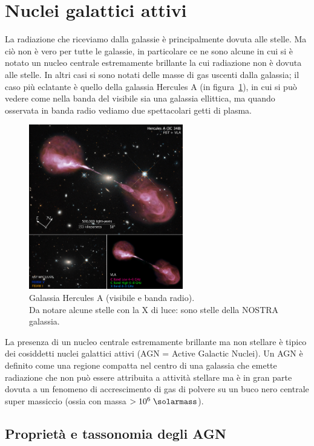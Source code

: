 \section{Nuclei galattici attivi} \label{sec:nuclei-galattici-attivi}
La radiazione che riceviamo dalla galassie è principalmente dovuta alle stelle. Ma ciò non è vero per tutte le galassie, in particolare ce ne sono alcune in cui si è notato un nucleo centrale estremamente brillante la cui radiazione non è dovuta alle stelle. In altri casi si sono notati delle masse di gas uscenti dalla galassia; il caso più eclatante è quello della galassia Hercules A (in figura~\ref{fig:hercules-a}), in cui si può vedere come nella banda del visibile sia una galassia ellittica, ma quando osservata in banda radio vediamo due spettacolari getti di plasma.

\begin{figure}
    \centering
    \includegraphics[width = 0.6\textwidth]{immagini/hercules-a.png}
    \caption{Galassia Hercules A (visibile e banda radio). \\ Da notare alcune stelle con la X di luce: sono stelle della NOSTRA galassia.}
    \label{fig:hercules-a}
\end{figure}

La presenza di un nucleo centrale estremamente brillante ma non stellare è tipico dei cosiddetti nuclei galattici attivi (AGN = Active Galactic Nuclei). Un AGN è definito come una regione compatta nel centro di una galassia che emette radiazione che non può essere attribuita a attività stellare ma è in gran parte dovuta a un fenomeno di accrescimento di gas di polvere su un buco nero centrale super massiccio (ossia con massa $> 10^6 \;\si{\solarmass}$). 

\subsection{Proprietà e tassonomia degli AGN}

